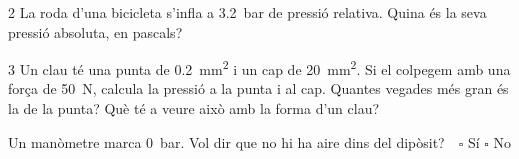 \begin{exercici}{2}
La roda d'una bicicleta s'infla a \SI{3,2}{\bar} de pressió relativa. Quina és la seva pressió absoluta, en pascals?
\end{exercici}

\begin{exercici}{3}
Un clau té una punta de \SI{0,2}{\milli\meter\squared} i un cap de \SI{20}{\milli\meter\squared}. Si el colpegem amb una força de \SI{50}{\newton}, calcula la pressió a la punta i al cap. Quantes vegades més gran és la de la punta? Què té a veure això amb la forma d'un clau?
\end{exercici}

\begin{comprova}
Un manòmetre marca \SI{0}{\bar}. Vol dir que no hi ha aire dins del dipòsit?\ \ $\square$ Sí \quad $\square$ No
\end{comprova}
